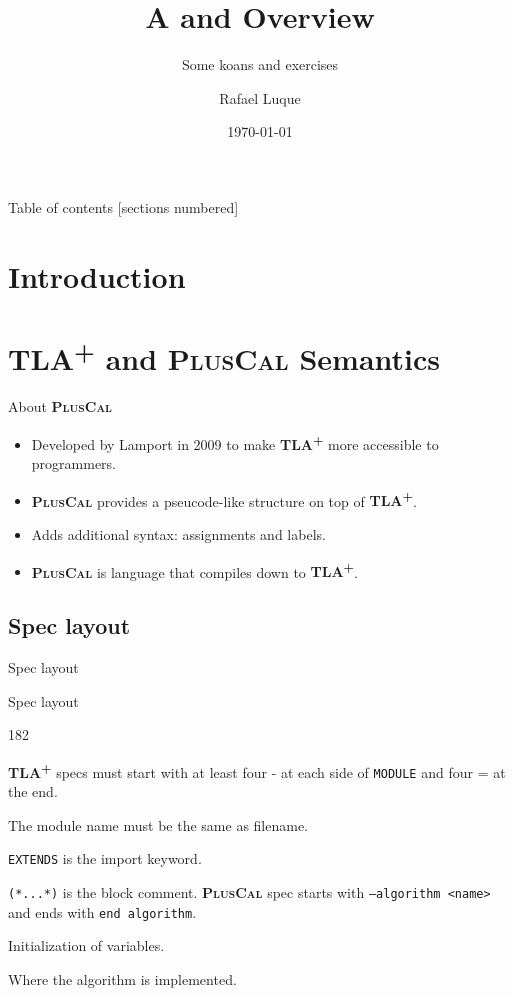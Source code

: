 \documentclass[10pt]{beamer}
\title{A \tlaplus and \pluscal Overview}
\subtitle{Some koans and exercises}
\date{\today}
\author{Rafael Luque}
\institute{OSOCO}
\newcommand{\tlaplus}{\textbf{\textsc{TLA\textsuperscript{+}}}\xspace}
\newcommand{\pluscal}{\textbf{\textsc{PlusCal}}\xspace}
\begin{document}
\maketitle

\begin{frame}{Table of contents}
  [sections numbered]
  \tableofcontents[hideallsubsections]
\end{frame}

\section{Introduction}

\section{\tlaplus and \pluscal Semantics}

\begin{frame}{About \pluscal}
  \begin{itemize}
    \item Developed by Lamport in 2009 to make \tlaplus more accessible to programmers.
    \item \pluscal provides a pseucode-like structure on top of \tlaplus.
    \item Adds additional syntax: \alert{assignments} and \alert{labels}.
    \item \pluscal is language that compiles down to \tlaplus.
  \end{itemize}
\end{frame}

\subsection{Spec layout}

\begin{frame}{Spec layout}
  \layoutSample
\end{frame}

\begin{frame}{Spec layout}
  \begin{dingautolist}{182}
  \item \tlaplus specs must start with at least four - at each side of \texttt{MODULE} and four = at the end.
  \item The module name must be the same as filename.
  \item \texttt{EXTENDS} is the import keyword.
  \item \texttt{(*...*)} is the block comment. \pluscal spec starts with \texttt{--algorithm <name>} and ends with \texttt{end algorithm}.
  \item Initialization of variables.
    \item Where the algorithm is implemented.
  \end{dingautolist}
\end{frame}
\end{document}
